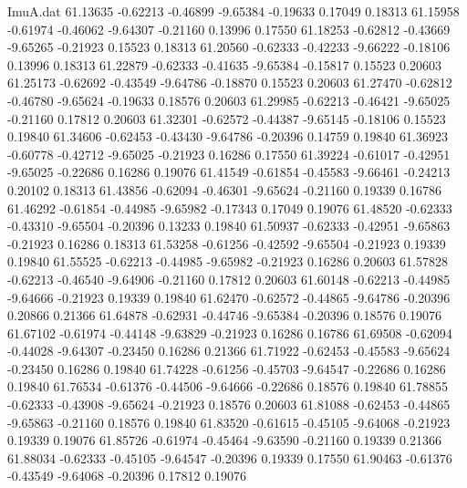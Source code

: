 \begin{filecontents}{ImuA.dat}
  61.13635   -0.62213   -0.46899   -9.65384   -0.19633    0.17049    0.18313
  61.15958   -0.61974   -0.46062   -9.64307   -0.21160    0.13996    0.17550
  61.18253   -0.62812   -0.43669   -9.65265   -0.21923    0.15523    0.18313
  61.20560   -0.62333   -0.42233   -9.66222   -0.18106    0.13996    0.18313
  61.22879   -0.62333   -0.41635   -9.65384   -0.15817    0.15523    0.20603
  61.25173   -0.62692   -0.43549   -9.64786   -0.18870    0.15523    0.20603
  61.27470   -0.62812   -0.46780   -9.65624   -0.19633    0.18576    0.20603
  61.29985   -0.62213   -0.46421   -9.65025   -0.21160    0.17812    0.20603
  61.32301   -0.62572   -0.44387   -9.65145   -0.18106    0.15523    0.19840
  61.34606   -0.62453   -0.43430   -9.64786   -0.20396    0.14759    0.19840
  61.36923   -0.60778   -0.42712   -9.65025   -0.21923    0.16286    0.17550
  61.39224   -0.61017   -0.42951   -9.65025   -0.22686    0.16286    0.19076
  61.41549   -0.61854   -0.45583   -9.66461   -0.24213    0.20102    0.18313
  61.43856   -0.62094   -0.46301   -9.65624   -0.21160    0.19339    0.16786
  61.46292   -0.61854   -0.44985   -9.65982   -0.17343    0.17049    0.19076
  61.48520   -0.62333   -0.43310   -9.65504   -0.20396    0.13233    0.19840
  61.50937   -0.62333   -0.42951   -9.65863   -0.21923    0.16286    0.18313
  61.53258   -0.61256   -0.42592   -9.65504   -0.21923    0.19339    0.19840
  61.55525   -0.62213   -0.44985   -9.65982   -0.21923    0.16286    0.20603
  61.57828   -0.62213   -0.46540   -9.64906   -0.21160    0.17812    0.20603
  61.60148   -0.62213   -0.44985   -9.64666   -0.21923    0.19339    0.19840
  61.62470   -0.62572   -0.44865   -9.64786   -0.20396    0.20866    0.21366
  61.64878   -0.62931   -0.44746   -9.65384   -0.20396    0.18576    0.19076
  61.67102   -0.61974   -0.44148   -9.63829   -0.21923    0.16286    0.16786
  61.69508   -0.62094   -0.44028   -9.64307   -0.23450    0.16286    0.21366
  61.71922   -0.62453   -0.45583   -9.65624   -0.23450    0.16286    0.19840
  61.74228   -0.61256   -0.45703   -9.64547   -0.22686    0.16286    0.19840
  61.76534   -0.61376   -0.44506   -9.64666   -0.22686    0.18576    0.19840
  61.78855   -0.62333   -0.43908   -9.65624   -0.21923    0.18576    0.20603
  61.81088   -0.62453   -0.44865   -9.65863   -0.21160    0.18576    0.19840
  61.83520   -0.61615   -0.45105   -9.64068   -0.21923    0.19339    0.19076
  61.85726   -0.61974   -0.45464   -9.63590   -0.21160    0.19339    0.21366
  61.88034   -0.62333   -0.45105   -9.64547   -0.20396    0.19339    0.17550
  61.90463   -0.61376   -0.43549   -9.64068   -0.20396    0.17812    0.19076

\end{filecontents}
